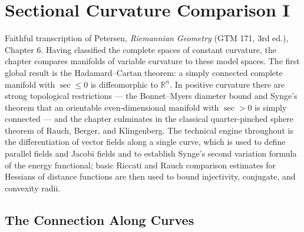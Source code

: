 \chapter{Sectional Curvature Comparison I}
\label{chap:pet-sectional-curvature-comparison-i}

Faithful transcription of Petersen, \emph{Riemannian Geometry} (GTM 171, 3rd ed.),
Chapter 6. Having classified the complete spaces of constant curvature, the chapter
compares manifolds of variable curvature to these model spaces. The first global
result is the Hadamard--Cartan theorem: a simply connected complete manifold with
$\sec\le0$ is diffeomorphic to $\mathbb{R}^n$. In positive curvature there are strong
topological restrictions — the Bonnet--Myers diameter bound and Synge's theorem
that an orientable even-dimensional manifold with $\sec>0$ is simply connected — and
the chapter culminates in the classical quarter-pinched sphere theorem of Rauch,
Berger, and Klingenberg. The technical engine throughout is the differentiation of
vector fields along a single curve, which is used to define parallel fields and
Jacobi fields and to establish Synge's second variation formula of the energy
functional; basic Riccati and Rauch comparison estimates for Hessians of distance
functions are then used to bound injectivity, conjugate, and convexity radii.

\section{The Connection Along Curves}

